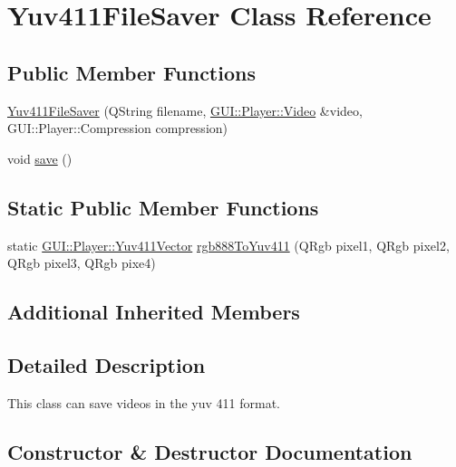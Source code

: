 \hypertarget{classGUI_1_1Player_1_1Yuv411FileSaver}{}\section{Yuv411\+File\+Saver Class Reference}
\label{classGUI_1_1Player_1_1Yuv411FileSaver}
\subsection*{Public Member Functions}
\begin{DoxyCompactItemize}
\item 
\hyperlink{classGUI_1_1Player_1_1Yuv411FileSaver_a18ce07b8da79b4b5ab569b96d395735d}{Yuv411\+File\+Saver} (Q\+String filename, \hyperlink{classGUI_1_1Player_1_1Video}{G\+U\+I\+::\+Player\+::\+Video} \&video, G\+U\+I\+::\+Player\+::\+Compression compression)
\item 
void \hyperlink{classGUI_1_1Player_1_1Yuv411FileSaver_aae2c382151ef7c9aa913361172b30db6}{save} ()
\end{DoxyCompactItemize}
\subsection*{Static Public Member Functions}
\begin{DoxyCompactItemize}
\item 
static \hyperlink{classGUI_1_1Player_1_1Yuv411Vector}{G\+U\+I\+::\+Player\+::\+Yuv411\+Vector} \hyperlink{classGUI_1_1Player_1_1Yuv411FileSaver_a911ac0e504e3ec500dc8a7162f5956d0}{rgb888\+To\+Yuv411} (Q\+Rgb pixel1, Q\+Rgb pixel2, Q\+Rgb pixel3, Q\+Rgb pixe4)
\end{DoxyCompactItemize}
\subsection*{Additional Inherited Members}


\subsection{Detailed Description}
This class can save videos in the yuv 411 format. 

\subsection{Constructor \& Destructor Documentation}
\hypertarget{classGUI_1_1Player_1_1Yuv411FileSaver_a18ce07b8da79b4b5ab569b96d395735d}{}
